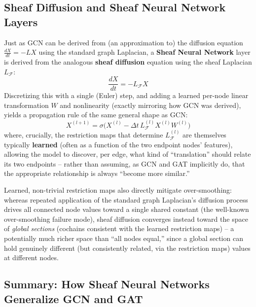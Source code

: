 \documentclass[12pt,a4paper]{article}
\begin{document}
\subsection{Sheaf Diffusion and Sheaf Neural Network Layers}

Just as GCN can be derived from (an approximation to) the diffusion equation $\frac{dX}{dt} = -LX$ using the standard graph Laplacian, a \textbf{Sheaf Neural Network} layer is derived from the analogous \textbf{sheaf diffusion} equation using the sheaf Laplacian $L_{\mathcal{F}}$:
\[
\frac{dX}{dt} = -L_{\mathcal{F}} X
\]
Discretizing this with a single (Euler) step, and adding a learned per-node linear transformation $W$ and nonlinearity (exactly mirroring how GCN was derived), yields a propagation rule of the same general shape as GCN:
\[
X^{(l+1)} = \sigma\Big(X^{(l)} - \Delta t\, L_{\mathcal{F}}^{(l)} X^{(l)} W^{(l)}\Big)
\]
where, crucially, the restriction maps that determine $L_{\mathcal{F}}^{(l)}$ are themselves typically \textbf{learned} (often as a function of the two endpoint nodes' features), allowing the model to discover, per edge, what kind of ``translation'' should relate its two endpoints -- rather than assuming, as GCN and GAT implicitly do, that the appropriate relationship is always ``become more similar.''

\begin{keyidea}
Learned, non-trivial restriction maps also directly mitigate over-smoothing: whereas repeated application of the standard graph Laplacian's diffusion process drives all connected node values toward a single shared constant (the well-known over-smoothing failure mode), sheaf diffusion converges instead toward the space of \emph{global sections} (cochains consistent with the learned restriction maps) -- a potentially much richer space than ``all nodes equal,'' since a global section can hold genuinely different (but consistently related, via the restriction maps) values at different nodes.
\end{keyidea}

\subsection{Summary: How Sheaf Neural Networks Generalize GCN and GAT}
\end{document}
